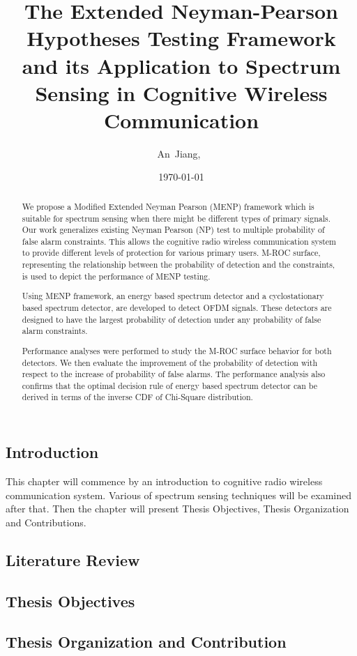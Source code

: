 \documentclass{article}
\author{An~Jiang,~
    }
\title{The Extended Neyman-Pearson Hypotheses Testing Framework and its Application to Spectrum Sensing in Cognitive Wireless Communication}
\date{\today}
\begin{document}
\begin{spacing}{2.0}
\maketitle
\begin{abstract}
We propose a Modified Extended Neyman Pearson (MENP) framework which is suitable for spectrum sensing when there might be different types of primary signals. Our work generalizes existing Neyman Pearson (NP) test to multiple probability of false alarm constraints. This allows the cognitive radio wireless communication system to provide different levels of protection for various primary users.  
M-ROC surface, representing the relationship between the probability of detection and the constraints, is used to depict the performance of MENP testing.   

Using MENP framework, an energy based spectrum detector and a cyclostationary based spectrum detector, are developed to detect OFDM signals. These detectors are designed to have the largest probability of detection under any probability of false alarm constraints.  

Performance analyses were performed to study the M-ROC surface behavior for both detectors. We then evaluate the improvement of the probability of detection with respect to the increase of probability of false alarms.  
The performance analysis also confirms that the optimal decision rule of energy based spectrum detector can be derived in terms of the inverse CDF of Chi-Square distribution.  
\end{abstract}

\section{Introduction}
This chapter will commence by an introduction to cognitive radio wireless communication system. Various of spectrum sensing techniques will be examined after that. 
Then the chapter will present Thesis Objectives, Thesis Organization and Contributions.
\subsection{Literature Review}
\subsection{Thesis Objectives}
\subsection{Thesis Organization and Contribution}
\newpage

\end{spacing}
\end{document}
